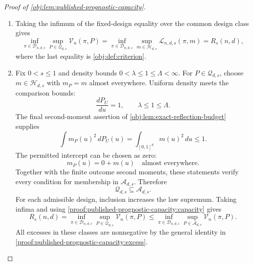\begin{proof}[Proof of \cref{obj:lem:published-prognostic-capacity}]
\begin{enumerate}
Conversely, a kernel in that design class has the required fairness. In the experiment generated from independent copies of any single-unit law, drawing signs from \(\pi(X)\) gives
\[
\operatorname{Law}\!\left(
Z\mid X,(O_i(0),O_i(1))_{i=1}^n
\right)
=\pi(X)
=\operatorname{Law}(Z\mid X).
\]
This proves the published conditional-independence requirement throughout its stated law class. Consequently,
\[
\pi\text{ satisfies published admissibility}
\quad\Longleftrightarrow\quad
\pi\in\mathcal D_{n,d,s}.
\]

\item\label{proof:published-prognostic-capacity:capacity} Taking the infimum of the fixed-design equality over the common design class gives
\[
\inf_{\pi\in\mathcal D_{n,d,s}}
\sup_{P\in\mathcal Q_{d,s}}\mathcal V_n(\pi,P)
=
\inf_{\pi\in\mathcal D_{n,d,s}}
\sup_{m\in\mathcal H_{d,s}}\mathcal L_{n,d,s}(\pi,m)
=R_s(n,d),
\]
where the last equality is \cref{obj:def:criterion}.

\item\label{proof:published-prognostic-capacity:comparison} Fix \(0<s\leq1\) and density bounds \(0<\lambda\leq1\leq\Lambda<\infty\). For \(P\in\mathcal Q_{d,s}\), choose \(m\in\mathcal H_{d,s}\) with \(m_P=m\) almost everywhere. Uniform density meets the comparison bounds:
\[
\frac{dP_U}{du}=1,
\qquad
\lambda\leq1\leq\Lambda.
\]
The final second-moment assertion of \cref{obj:lem:exact-reflection-budget} supplies
\[
\int m_P(u)^2\,dP_U(u)
=
\int_{[0,1]^d}m(u)^2\,du
\leq1.
\]
The permitted intercept can be chosen as zero:
\[
m_P(u)=0+m(u)\quad\text{almost everywhere}.
\]
Together with the finite outcome second moments, these statements verify every condition for membership in \(\mathcal A_{d,s}\). Therefore
\[
\mathcal Q_{d,s}\subseteq\mathcal A_{d,s}.
\]
For each admissible design, inclusion increases the law supremum. Taking infima and using \cref{proof:published-prognostic-capacity:capacity} gives
\[
R_s(n,d)
=
\inf_{\pi\in\mathcal D_{n,d,s}}
\sup_{P\in\mathcal Q_{d,s}}\mathcal V_n(\pi,P)
\leq
\inf_{\pi\in\mathcal D_{n,d,s}}
\sup_{P\in\mathcal A_{d,s}}\mathcal V_n(\pi,P).
\]
All excesses in these classes are nonnegative by the general identity in \cref{proof:published-prognostic-capacity:excess}.


\end{enumerate}
\end{proof}
